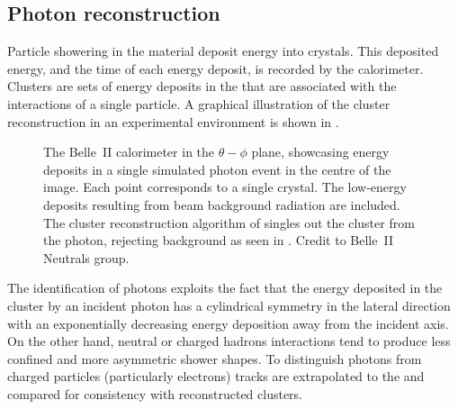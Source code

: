 \subsection{Photon reconstruction}\label{sec:neutrals}

Particle showering in the \ECL material deposit energy into \ECL crystals.
This deposited energy, and the time of each energy deposit, is recorded by the calorimeter.
Clusters are sets of energy deposits in the \ECL that are associated with the interactions of a single particle.
A graphical illustration of the cluster reconstruction in an experimental environment is shown in .
\begin{figure}[htbp!]
    \centering
    \caption{\label{fig:clustering}
    The Belle~II calorimeter in the $\theta-\phi$ plane, 
    showcasing energy deposits in a single simulated photon event in the centre of the image.
    Each point corresponds to a single \ECL crystal.
    The low-energy deposits resulting from beam background radiation are included.
    The cluster reconstruction algorithm of \basftwo singles out the cluster from the photon, 
    rejecting background as seen in .
    Credit to Belle~II Neutrals group.
    }
\end{figure}

The identification of photons exploits the fact that the energy deposited in the cluster
by an incident photon has a cylindrical symmetry in the lateral direction with an exponentially decreasing energy deposition away from the incident axis.
On the other hand, neutral or charged hadrons interactions tend to produce less confined and more asymmetric shower shapes.
To distinguish photons from charged particles (particularly electrons) tracks are extrapolated to the \ECL and compared for consistency with reconstructed clusters.
